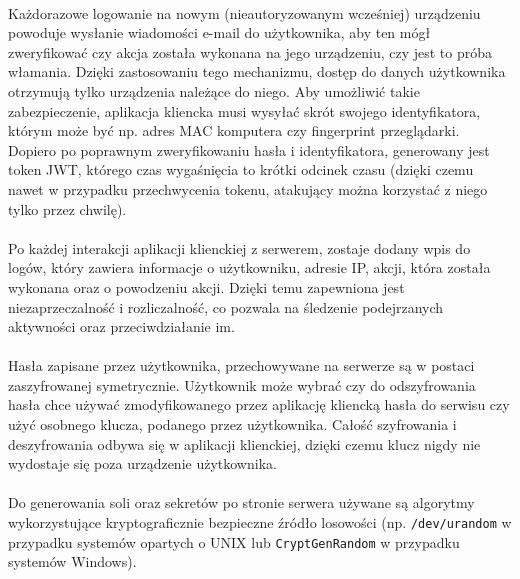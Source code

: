 \documentclass{article}
\begin{document}
    \paragraph{}Każdorazowe logowanie na nowym (nieautoryzowanym wcześniej) urządzeniu powoduje wysłanie wiadomości e-mail do użytkownika, aby ten mógł zweryfikować czy akcja została wykonana na jego urządzeniu, czy jest to próba włamania. Dzięki zastosowaniu tego mechanizmu, dostęp do danych użytkownika otrzymują tylko urządzenia należące do niego. Aby umożliwić takie zabezpieczenie, aplikacja kliencka musi wysyłać skrót swojego identyfikatora, którym może być np. adres MAC komputera czy fingerprint przeglądarki. Dopiero po poprawnym zweryfikowaniu hasła i identyfikatora, generowany jest token JWT, którego czas wygaśnięcia to krótki odcinek czasu (dzięki czemu nawet w przypadku przechwycenia tokenu, atakujący można korzystać z niego tylko przez chwilę).

    \paragraph{}Po każdej interakcji aplikacji klienckiej z serwerem, zostaje dodany wpis do logów, który zawiera informacje o użytkowniku, adresie IP, akcji, która została wykonana oraz o powodzeniu akcji. Dzięki temu zapewniona jest niezaprzeczalność i rozliczalność, co pozwala na śledzenie podejrzanych aktywności oraz przeciwdziałanie im.

    \paragraph{}Hasła zapisane przez użytkownika, przechowywane na serwerze są w postaci zaszyfrowanej symetrycznie. Użytkownik może wybrać czy do odszyfrowania hasła chce używać zmodyfikowanego przez aplikację kliencką hasła do serwisu czy użyć osobnego klucza, podanego przez użytkownika. Całość szyfrowania i deszyfrowania odbywa się w aplikacji klienckiej, dzięki czemu klucz nigdy nie wydostaje się poza urządzenie użytkownika.

    \paragraph{}Do generowania soli oraz sekretów po stronie serwera używane są algorytmy wykorzystujące kryptograficznie bezpieczne źródło losowości (np. \texttt{/dev/urandom} w przypadku systemów opartych o UNIX lub \texttt{CryptGenRandom} w przypadku systemów Windows).
\end{document}
